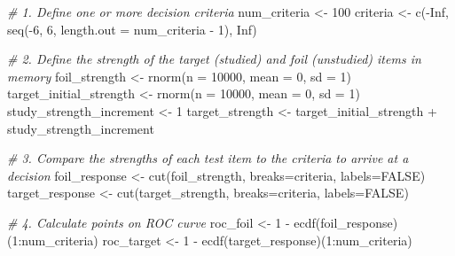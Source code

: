 \documentclass[
]{book}
\newenvironment{Shaded}{\begin{snugshade}}{\end{snugshade}}
\newcommand{\AttributeTok}[1]{\textcolor[rgb]{0.77,0.63,0.00}{#1}}
\newcommand{\CommentTok}[1]{\textcolor[rgb]{0.56,0.35,0.01}{\textit{#1}}}
\newcommand{\ConstantTok}[1]{\textcolor[rgb]{0.00,0.00,0.00}{#1}}
\newcommand{\DecValTok}[1]{\textcolor[rgb]{0.00,0.00,0.81}{#1}}
\newcommand{\FunctionTok}[1]{\textcolor[rgb]{0.00,0.00,0.00}{#1}}
\newcommand{\NormalTok}[1]{#1}
\newcommand{\OtherTok}[1]{\textcolor[rgb]{0.56,0.35,0.01}{#1}}
\newcommand{\SpecialCharTok}[1]{\textcolor[rgb]{0.00,0.00,0.00}{#1}}
\begin{document}
\begin{Shaded}
\begin{Highlighting}[]
\CommentTok{\# 1. Define one or more decision criteria}
\NormalTok{num\_criteria }\OtherTok{\textless{}{-}} \DecValTok{100}
\NormalTok{criteria }\OtherTok{\textless{}{-}} \FunctionTok{c}\NormalTok{(}\SpecialCharTok{{-}}\ConstantTok{Inf}\NormalTok{, }\FunctionTok{seq}\NormalTok{(}\SpecialCharTok{{-}}\DecValTok{6}\NormalTok{, }\DecValTok{6}\NormalTok{, }\AttributeTok{length.out =}\NormalTok{ num\_criteria }\SpecialCharTok{{-}} \DecValTok{1}\NormalTok{), }\ConstantTok{Inf}\NormalTok{)}

\CommentTok{\# 2. Define the strength of the target (studied) and foil (unstudied) items in memory}
\NormalTok{foil\_strength }\OtherTok{\textless{}{-}} \FunctionTok{rnorm}\NormalTok{(}\AttributeTok{n =} \DecValTok{10000}\NormalTok{, }\AttributeTok{mean =} \DecValTok{0}\NormalTok{, }\AttributeTok{sd =} \DecValTok{1}\NormalTok{)}
\NormalTok{target\_initial\_strength }\OtherTok{\textless{}{-}} \FunctionTok{rnorm}\NormalTok{(}\AttributeTok{n =} \DecValTok{10000}\NormalTok{, }\AttributeTok{mean =} \DecValTok{0}\NormalTok{, }\AttributeTok{sd =} \DecValTok{1}\NormalTok{)}
\NormalTok{study\_strength\_increment }\OtherTok{\textless{}{-}} \DecValTok{1}
\NormalTok{target\_strength }\OtherTok{\textless{}{-}}\NormalTok{ target\_initial\_strength }\SpecialCharTok{+}\NormalTok{ study\_strength\_increment}

\CommentTok{\# 3. Compare the strengths of each test item to the criteria to arrive at a decision}
\NormalTok{foil\_response }\OtherTok{\textless{}{-}} \FunctionTok{cut}\NormalTok{(foil\_strength, }\AttributeTok{breaks=}\NormalTok{criteria, }\AttributeTok{labels=}\ConstantTok{FALSE}\NormalTok{)}
\NormalTok{target\_response }\OtherTok{\textless{}{-}} \FunctionTok{cut}\NormalTok{(target\_strength, }\AttributeTok{breaks=}\NormalTok{criteria, }\AttributeTok{labels=}\ConstantTok{FALSE}\NormalTok{)}

\CommentTok{\# 4. Calculate points on ROC curve}
\NormalTok{roc\_foil }\OtherTok{\textless{}{-}} \DecValTok{1} \SpecialCharTok{{-}} \FunctionTok{ecdf}\NormalTok{(foil\_response)(}\DecValTok{1}\SpecialCharTok{:}\NormalTok{num\_criteria)}
\NormalTok{roc\_target }\OtherTok{\textless{}{-}} \DecValTok{1} \SpecialCharTok{{-}} \FunctionTok{ecdf}\NormalTok{(target\_response)(}\DecValTok{1}\SpecialCharTok{:}\NormalTok{num\_criteria)}


\end{Highlighting}
\end{Shaded}
\end{document}
